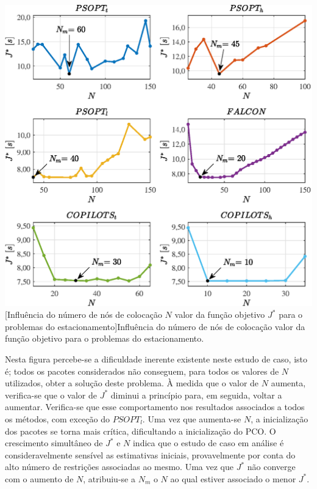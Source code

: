 \noindent	
\begin{minipage}{\textwidth}
	\vspace{\onelineskip}
	\centering
	\includegraphics[scale=0.7]{fig/resultados/estacionamento/sens/J}
	[Influência do número de nós de colocação $ N $ valor da função objetivo $ J^* $ para o problemas do estacionamento]{Influência do número de nós de colocação valor da função objetivo para o problemas do estacionamento.}
	\label{fig:estacionamento:sensibilidade:J}
	\vspace{\onelineskip}
\end{minipage}


Nesta figura percebe-se a dificuldade inerente existente neste estudo de caso, isto é; todos os pacotes considerados não conseguem, para todos os valores de $N$ utilizados, obter a solução deste problema. À  medida que o valor de $N$ aumenta, verifica-se que o valor de $J^*$ diminui a princípio para, em seguida, voltar a aumentar. Verifica-se que esse comportamento nos resultados associados a todos os métodos, com exceção do $PSOPT_l$.  Uma vez que aumenta-se $N$, a inicialização dos pacotes se torna mais crítica, dificultando a inicialização do PCO. O crescimento simultâneo de $J^*$ e $N$ indica que o estudo de caso em análise é consideravelmente sensível as estimativas iniciais, provavelmente por conta do alto número de restrições associadas ao mesmo. Uma vez que $J^*$ não converge com o aumento de $N$, atribuiu-se a $N_m$ o $N$ ao qual estiver associado o menor $J^*$.

